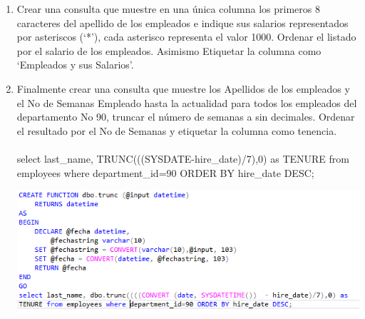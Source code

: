 \begin{enumerate}[1.]
	\item Crear una consulta que muestre en una única columna los primeros 8 caracteres del apellido de los empleados e indique sus salarios representados por asteriscos (‘*’), cada asterisco representa el valor 1000. Ordenar el listado por el salario de los empleados. Asimismo Etiquetar la columna como ‘Empleados y sus Salarios’.
	\item Finalmente crear una consulta que muestre los Apellidos de los empleados y el No de Semanas Empleado hasta la actualidad para todos los empleados del departamento No 90, truncar el número de semanas a sin decimales. Ordenar el resultado por el No de Semanas y etiquetar la columna como tenencia.
	\\
	\\select last\_name, TRUNC(((SYSDATE-hire\_date)/7),0) as TENURE from employees where department\_id=90 ORDER BY hire\_date DESC;
	\begin{center}
		\includegraphics[width=17cm]{./Imagenes/actividad_05_08}
	\end{center}
\end{enumerate}

